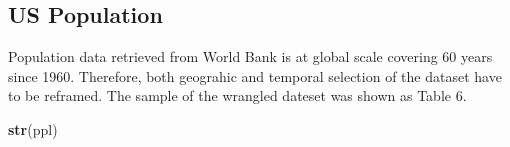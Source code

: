 \documentclass[12pt,]{article}
\newenvironment{Shaded}{\begin{snugshade}}{\end{snugshade}}
\newcommand{\KeywordTok}[1]{\textcolor[rgb]{0.13,0.29,0.53}{\textbf{#1}}}
\newcommand{\NormalTok}[1]{#1}
\begin{document}
\newpage

\subsection{US Population}\label{us-population}

Population data retrieved from World Bank is at global scale covering 60
years since 1960. Therefore, both geograhic and temporal selection of
the dataset have to be reframed. The sample of the wrangled dateset was
shown as Table 6.

\begin{Shaded}
\begin{Highlighting}[]
\KeywordTok{str}\NormalTok{(ppl)}
\end{Highlighting}
\end{Shaded}
\end{document}
